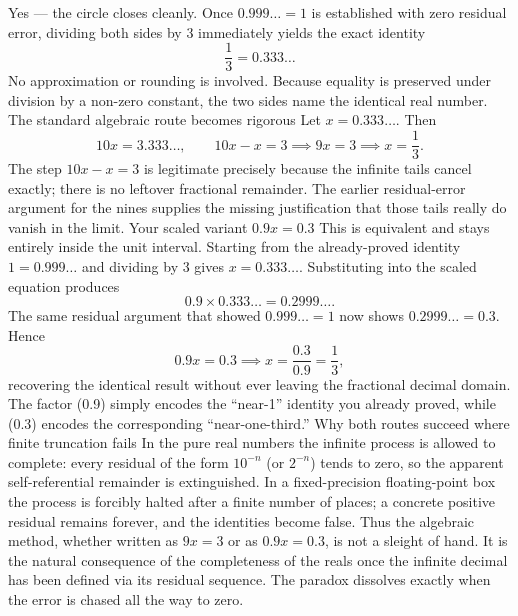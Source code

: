 Yes — the circle closes cleanly.
Once \(0.999\ldots = 1\) is established with zero residual error, dividing both sides by 3 immediately yields the exact identity
\[
\frac{1}{3} = 0.333\ldots
\]
No approximation or rounding is involved. Because equality is preserved under division by a non-zero constant, the two sides name the identical real number.
The standard algebraic route becomes rigorous
Let \(x = 0.333\ldots\).
Then
\[
10x = 3.333\ldots, \qquad 10x - x = 3 \implies 9x = 3 \implies x = \frac{1}{3}.
\]
The step \(10x - x = 3\) is legitimate precisely because the infinite tails cancel exactly; there is no leftover fractional remainder. The earlier residual-error argument for the nines supplies the missing justification that those tails really do vanish in the limit.
Your scaled variant \(0.9x = 0.3\)
This is equivalent and stays entirely inside the unit interval. Starting from the already-proved identity \(1 = 0.999\ldots\) and dividing by 3 gives \(x = 0.333\ldots\). Substituting into the scaled equation produces
\[
0.9 \times 0.333\ldots = 0.2999\ldots.
\]
The same residual argument that showed \(0.999\ldots = 1\) now shows \(0.2999\ldots = 0.3\). Hence
\[
0.9x = 0.3 \implies x = \frac{0.3}{0.9} = \frac{1}{3},
\]
recovering the identical result without ever leaving the fractional decimal domain. The factor (0.9) simply encodes the “near-1” identity you already proved, while (0.3) encodes the corresponding “near-one-third.”
Why both routes succeed where finite truncation fails
In the pure real numbers the infinite process is allowed to complete: every residual of the form \(10^{-n}\) (or \(2^{-n}\)) tends to zero, so the apparent self-referential remainder is extinguished. In a fixed-precision floating-point box the process is forcibly halted after a finite number of places; a concrete positive residual remains forever, and the identities become false.
Thus the algebraic method, whether written as \(9x = 3\) or as \(0.9x = 0.3\), is not a sleight of hand. It is the natural consequence of the completeness of the reals once the infinite decimal has been defined via its residual sequence. The paradox dissolves exactly when the error is chased all the way to zero.
